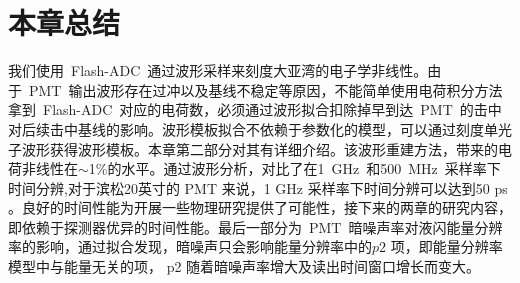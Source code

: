 \section{本章总结}
我们使用~Flash-ADC~通过波形采样来刻度大亚湾的电子学非线性。由于~PMT~输出波形存在过冲以及基线不稳定等原因，不能简单使用电荷积分方法拿到~Flash-ADC~对应的电荷数，必须通过波形拟合扣除掉早到达~PMT~的击中对后续击中基线的影响。波形模板拟合不依赖于参数化的模型，可以通过刻度单光子波形获得波形模板。本章第二部分对其有详细介绍。该波形重建方法，带来的电荷非线性在$\sim$1\%的水平。通过波形分析，对比了在1~GHz~和500~MHz~采样率下时间分辨,对于滨松20英寸的 PMT 来说，1 GHz 采样率下时间分辨可以达到50 ps 。良好的时间性能为开展一些物理研究提供了可能性，接下来的两章的研究内容，即依赖于探测器优异的时间性能。最后一部分为~PMT~暗噪声率对液闪能量分辨率的影响，通过拟合发现，暗噪声只会影响能量分辨率中的$p2$ 项，即能量分辨率模型中与能量无关的项， p2 随着暗噪声率增大及读出时间窗口增长而变大。